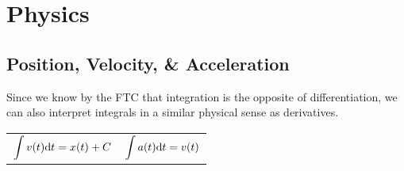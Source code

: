 \section{Physics}
\subsection{Position, Velocity, \& Acceleration}
Since we know by the FTC that integration is the opposite of differentiation, we can also interpret integrals in a similar physical sense as derivatives.
\begin{table}[H]
	\begin{center}
		\begin{tabular}{ l l }
			$\begin{aligned}\int{v(t)\mathrm{d} t}=x(t) + C\end{aligned}$ & $\begin{aligned}\int{a(t)\mathrm{d} t}=v(t)\end{aligned}$
		\end{tabular}
	\end{center}
\end{table}

